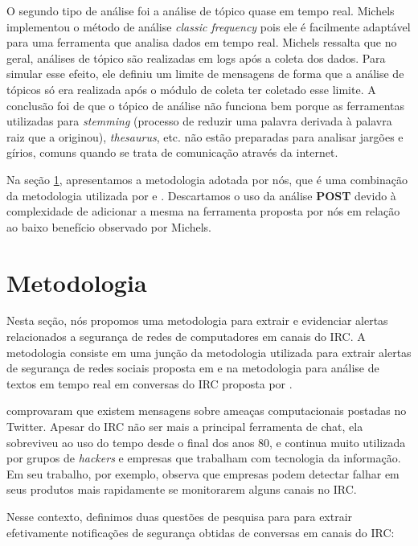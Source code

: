 \documentclass[12pt]{article}
\begin{document}
O segundo tipo de análise foi a análise de tópico quase em tempo real.
Michels implementou o método de análise \textit{classic frequency}
\cite{gainaru2010} pois ele é facilmente adaptável para uma ferramenta que analisa
dados em tempo real.
%
Michels ressalta que no geral, análises de tópico são realizadas em logs
após a coleta dos dados. Para simular esse efeito, ele definiu um limite de
mensagens de forma que a análise de tópicos só era realizada após o módulo de
coleta ter coletado esse limite.
%
A conclusão foi de que o tópico de análise não funciona bem porque as
ferramentas utilizadas para \textit{stemming} (processo de reduzir uma
palavra derivada à palavra raiz que a originou), \textit{thesaurus}, etc.
não estão preparadas para analisar jargões e gírios, comuns quando se trata
de comunicação através da internet.

Na seção \ref{sec:metod}, apresentamos a metodologia adotada por nós, que
é uma combinação da metodologia utilizada por \cite{santos2013} e
\cite{michels2012}.
%
Descartamos o uso da análise \textbf{POST} devido à complexidade de adicionar
a mesma na ferramenta proposta por nós em relação ao baixo benefício observado
por Michels.



\section{Metodologia} \label{sec:metod}

Nesta seção, nós propomos uma metodologia para extrair e evidenciar alertas
relacionados a segurança de redes de computadores em canais do IRC. A
metodologia consiste em uma junção da metodologia utilizada para extrair
alertas de segurança de redes sociais proposta em\cite{santos2013} e na
metodologia para análise de textos em tempo real em conversas do IRC proposta
por \cite{michels2012}.

\cite{santos2012, campiolo2013} comprovaram que existem mensagens sobre ameaças
computacionais postadas no Twitter.
%
Apesar do IRC não ser mais a principal ferramenta de chat, ela
sobreviveu ao uso do tempo desde o final dos anos 80, e continua muito
utilizada por grupos de \textit{hackers} e empresas que trabalham com
tecnologia da informação. Em seu trabalho, por exemplo, \cite{michels2012}
observa que empresas podem detectar falhar em seus produtos mais rapidamente
se monitorarem alguns canais no IRC.

Nesse contexto, definimos duas questões de pesquisa para para extrair
efetivamente notificações de segurança obtidas de conversas em canais do IRC:
\end{document}
